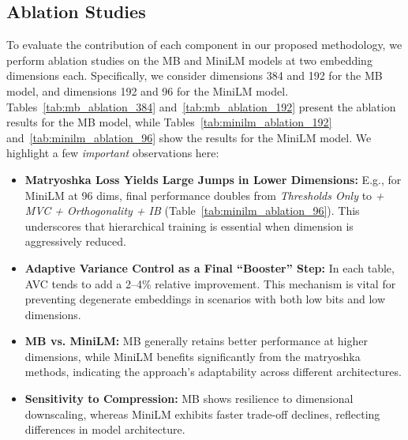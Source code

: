 \subsection{Ablation Studies}
\label{sec:ablation_summaries}

To evaluate the contribution of each component in our proposed methodology, we perform ablation studies on the MB and MiniLM models at two embedding dimensions each. 
Specifically, we consider dimensions 384 and 192 for the MB model, and dimensions 192 and 96 for the MiniLM model. 
Tables~\ref{tab:mb_ablation_384} and~\ref{tab:mb_ablation_192} present the ablation results for the MB model, while Tables~\ref{tab:minilm_ablation_192} and~\ref{tab:minilm_ablation_96} show the results for the MiniLM model.
We highlight a few \emph{important} observations here:
\begin{itemize}
    \item \textbf{Matryoshka Loss Yields Large Jumps in Lower Dimensions:} E.g., for MiniLM at 96 dims, final performance doubles from \textit{Thresholds Only} to \textit{+ MVC + Orthogonality + IB} (Table~\ref{tab:minilm_ablation_96}). This underscores that hierarchical training is essential when dimension is aggressively reduced.
    \item \textbf{Adaptive Variance Control as a Final “Booster” Step:} In each table, AVC tends to add a 2--4\% relative improvement. This mechanism is vital for preventing degenerate embeddings in scenarios with both low bits and low dimensions.

    \item \textbf{MB vs. MiniLM:} MB generally retains better performance at higher dimensions, while MiniLM benefits significantly from the matryoshka methods, indicating the approach's adaptability across different architectures.
    \item \textbf{Sensitivity to Compression:} MB shows resilience to dimensional downscaling, whereas MiniLM exhibits faster trade-off declines, reflecting differences in model architecture.
\end{itemize}

